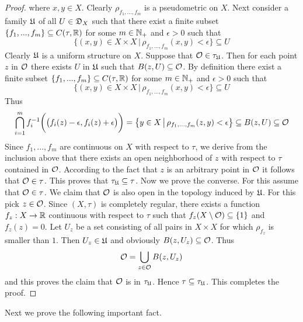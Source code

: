 \begin{proof}
where $x,y\in X$. Clearly $\rho_{f_1,...,f_m}$ is a pseudometric on $X$. Next consider a family ${\mathfrak U}$ of all $U\in {\mathfrak D}_X$ such that there exist a finite subset $\{f_1,...,f_m\}\subseteq C(\tau,{\mathbb R})$ for some $m \in {\mathbb N}_+$ and $\epsilon > 0$ such that
$$\big\{(x,y)\in X\times X\,\big|\,\rho_{f_1,...,f_m}(x,y) < \epsilon\big\}\subseteq U$$
Clearly ${\mathfrak U}$ is a uniform structure on $X$. Suppose that ${\mathcal O} \in \tau_{{\mathfrak U}}$. Then for each point $z$ in ${\mathcal O}$ there exists $U$ in ${\mathfrak U}$ such that $B(z,U)\subseteq {\mathcal O}$. By definition there exist a finite subset $\{f_1,...,f_m\}\subseteq C(\tau,{\mathbb R})$ for some $m \in {\mathbb N}_+$ and $\epsilon > 0$ such that
$$\big\{(x,y)\in X\times X\,\big|\,\rho_{f_1,...,f_m}(x,y) < \epsilon\big\}\subseteq U$$
Thus
$$\bigcap_{i=1}^mf_i^{-1}\bigg(\big(f_i(z) - \epsilon, f_i(z) + \epsilon\big)\bigg) = \big\{y\in X \,\big|\, \rho_{f_1,...,f_m}(z,y) < \epsilon\big\} \subseteq B(z,U)\subseteq {\mathcal O}$$
Since $f_1,...,f_m$ are continuous on $X$ with respect to $\tau$, we derive from the inclusion above that there exists an open neighborhood of $z$ with respect to $\tau$ contained in ${\mathcal O}$. According to the fact that $z$ is an arbitrary point in ${\mathcal O}$ it follows that ${\mathcal O} \in \tau$. This proves that $\tau_{{\mathfrak U}}\subseteq \tau$. Now we prove the converse. For this assume that ${\mathcal O} \in \tau$. We claim that ${\mathcal O}$ is also open in the topology induced by ${\mathfrak U}$. For this pick $z \in {\mathcal O}$. Since $(X,\tau)$ is completely regular, there exists a function $f_z:X\rightarrow {\mathbb R}$ continuous with respect to $\tau$ such that $f_z(X\setminus {\mathcal O})\subseteq \{1\}$ and $f_z(z) = 0$. Let $U_z$ be a set consisting of all pairs in $X\times X$ for which $\rho_{f_z}$ is smaller than $1$. Then $U_z\in {\mathfrak U}$ and obviously $B(z,U_z)\subseteq {\mathcal O}$. Thus
$${\mathcal O} = \bigcup_{z\in {\mathcal O}}B(z,U_z)$$
and this proves the claim that ${\mathcal O}$ is in $\tau_{{\mathfrak U}}$. Hence $\tau \subseteq \tau_{{\mathfrak U}}$. This completes the proof.
\end{proof}
\noindent
Next we prove the following important fact.

